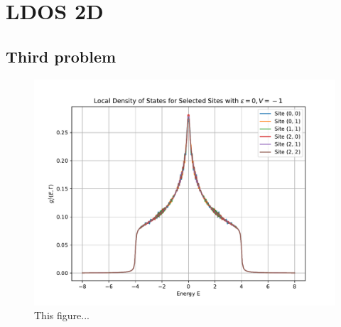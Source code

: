 \section{LDOS 2D}

\subsection{Third problem}

\begin{figure}[H]
    \centering    \includegraphics[width=\textwidth]{Figures/task3.pdf}
    \caption{This figure...}
    \label{fig:task3}
\end{figure}